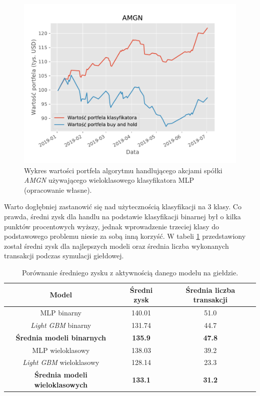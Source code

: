 \documentclass[a4paper, twoside, 11pt, openright]{article}
\begin{document}
\begin{figure}[H]
\centering \includegraphics[scale=0.9]{img/AMGN-balance-plot.pdf}
\caption{Wykres wartości portfela algorytmu handlującego akcjami spółki \textit{AMGN} używającego wieloklasowego klasyfikatora MLP (opracowanie własne).}
\label{img:amgn_wallet_value}
\end{figure}

Warto dogłębniej zastanowić się nad użytecznością klasyfikacji na 3 klasy. Co prawda, średni zysk dla handlu na podstawie klasyfikacji binarnej był o kilka punktów procentowych wyższy, jednak wprowadzenie trzeciej klasy do podstawowego problemu niesie za sobą inną korzyść. W tabeli \ref{tab:simulation_avg_value_vs_transactions} przedstawiony został średni zysk dla najlepszych modeli oraz średnia liczba wykonanych transakcji podczas symulacji giełdowej.

 \begin{table}[H]
    \centering
    \begin{tabular}{|c|c|c|}
    \hline
        \textbf{Model}  & \textbf{Średni zysk} & \textbf{Średnia liczba transakcji}\\ \hline
            MLP binarny & 140.01 & 51.0 \\ \hline
            \textit{Light GBM} binarny & 131.74 & 44.7 \\ \hline 
            \textbf{Średnia modeli binarnych} & \textbf{135.9} & \textbf{47.8} \\ \hline \hline
            
            MLP wieloklasowy & 138.03 & 39.2 \\ \hline
            \textit{Light GBM} wieloklasowy & 128.14 & 23.3 \\ \hline
            \textbf{Średnia modeli wieloklasowych} & \textbf{133.1} & \textbf{31.2} \\ \hline
    \end{tabular}
    \caption{Porównanie średniego zysku z aktywnością danego modelu na giełdzie.}
    \label{tab:simulation_avg_value_vs_transactions}
\end{table} 
\end{document}
